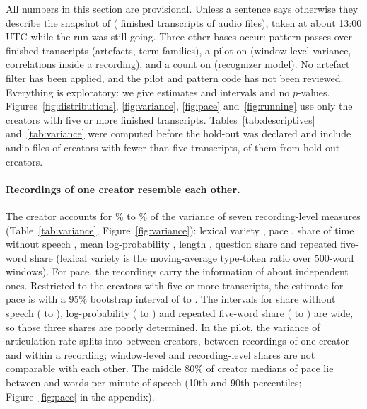 \documentclass[letterpaper]{article} %
\newcommand{\snap}{snapshot of \SnapDate{} (\SnapLines{} finished transcripts of \NRunAudio{} audio files)}
\begin{document}
All numbers in this section are provisional. Unless a sentence says otherwise they describe the \snap, taken at about 13:00 UTC while the run was still going. Three other bases occur: pattern passes over \ArtBase{} finished transcripts (artefacts, term families), a pilot on \VpLedger{} (window-level variance, correlations inside a recording), and a count on \ModelCountBase{} (recognizer model). No artefact filter has been applied, and the pilot and pattern code has not been reviewed. Everything is exploratory: we give estimates and intervals and no $p$-values. Figures~\ref{fig:distributions}, \ref{fig:variance}, \ref{fig:pace} and~\ref{fig:running} use only the \SnapCreatorsFivePlus{} creators with five or more finished transcripts. Tables~\ref{tab:descriptives} and~\ref{tab:variance} were computed before the hold-out was declared and include \LowCountInSnapshot{} audio files of creators with fewer than five transcripts, \HoldoutInSnapshot{} of them from hold-out creators.



\paragraph{Recordings of one creator resemble each other.} The creator accounts for \IccMinPct\% to \IccMaxPct\% of the variance of seven recording-level measures (Table~\ref{tab:variance}, Figure~\ref{fig:variance}): lexical variety \IccMattr, pace \IccPace, share of time without speech \IccNonSp, mean log-probability \IccLogp, length \IccLen, question share \IccQuest{} and repeated five-word share \IccRep{} (lexical variety is the moving-average type-token ratio over 500-word windows). For pace, the \IccPaceRecordings{} recordings carry the information of about \NeffPace{} independent ones. Restricted to the \SnapCreatorsFivePlus{} creators with five or more transcripts, the estimate for pace is \IccPaceSeen{} with a 95\% bootstrap interval of \IccPaceSeenLo{} to \IccPaceSeenHi. The intervals for share without speech (\IccNonSpSeenLo{} to \IccNonSpSeenHi), log-probability (\IccLogpSeenLo{} to \IccLogpSeenHi) and repeated five-word share (\IccRepSeenLo{} to \IccRepSeenHi) are wide, so those three shares are poorly determined. In the pilot, the variance of articulation rate splits into \VpArtCreator{} between creators, \VpArtRecording{} between recordings of one creator and \VpArtWithin{} within a recording; window-level and recording-level shares are not comparable with each other. The middle 80\% of creator medians of pace lie between \CrPacePten{} and \CrPacePninety{} words per minute of speech (10th and 90th percentiles; Figure~\ref{fig:pace} in the appendix).
\end{document}
